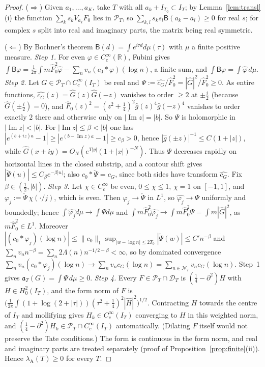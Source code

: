 \documentclass[11pt]{amsart}
\theoremstyle{definition}
\theoremstyle{remark}
\newcommand{\R}{\mathbb R}
\newcommand{\Iml}{\operatorname{Im}}
\newcommand{\PT}{\mathcal P_T}
\newcommand{\IT}{I_T}
\newcommand{\lamA}{\lambda_{\mathrm A}(T)}
\newcommand{\Fh}{\widehat F}
\newcommand{\NT}{\mathcal N_T}
\begin{document}
\begin{proof}
($\Rightarrow$) Given $a_1,\dots,a_K$, take $T$ with all $a_k+I_{T_0}\subset\IT$; by Lemma~\ref{lem:transl}(i) the function
$\sum_ks_kV_{a_k}F_0$ lies in $\PT$, so $\sum_{k,l}s_ks_l\mathsf B(a_k-a_l)\ge0$ for real $s$; for complex $s$ split into real and imaginary
parts, the matrix being real symmetric.

($\Leftarrow$) By Bochner's theorem $\mathsf B(d)=\int e^{i\tau d}d\mu(\tau)$ with $\mu$ a finite positive measure.
\emph{Step 1.} For even $\varphi\in C_c^\infty(\R)$, Fubini gives
$\int\mathsf B\varphi=\frac1{2\pi}\int m\Fh_0^2\widehat\varphi-\sum_nv_n(c_0*\varphi)(\log n)$, a finite sum, and $\int\mathsf B\varphi=\int\widehat\varphi\,d\mu$.
\emph{Step 2.} Let $G\in\PT\cap C_c^\infty(\IT)$ be real and $\Psi:=\widehat{c_G}/\Fh_0^2=|\widehat G|^2/\Fh_0^2\ge0$. As entire functions,
$\widehat{c_G}(z)=\widehat G(z)\widehat G(-z)$ vanishes to order $\ge2$ at $\pm\frac i2$ (because $\widehat G(\pm\frac i2)=0$), and
$\Fh_0(z)^2=(z^2+\frac14)^2\widehat g(z)^4\widehat g(-z)^4$ vanishes to order exactly $2$ there and otherwise only on $|\Iml z|=|b|$. So $\Psi$
is holomorphic in $|\Iml z|<|b|$. For $|\Iml z|\le\beta<|b|$ one has $|e^{(b+iz)a}-1|\ge|e^{(b-\Iml z)a}-1|\ge c_\beta>0$, hence
$|\widehat g(\pm z)|^{-1}\le C(1+|z|)$, while $\widehat G(x+iy)=O_N(e^{T|y|}(1+|x|)^{-N})$. Thus $\Psi$ decreases rapidly on horizontal
lines in the closed substrip, and a contour shift gives $|\check\Psi(u)|\le C_\beta e^{-\beta|u|}$; also $c_0*\check\Psi=c_G$, since both
sides have transform $\widehat{c_G}$. Fix $\beta\in(\frac12,|b|)$.
\emph{Step 3.} Let $\chi\in C_c^\infty$ be even, $0\le\chi\le1$, $\chi=1$ on $[-1,1]$, and $\varphi_j:=\check\Psi\,\chi(\cdot/j)$, which is even.
Then $\varphi_j\to\check\Psi$ in $L^1$, so $\widehat{\varphi_j}\to\Psi$ uniformly and boundedly; hence $\int\widehat{\varphi_j}d\mu\to\int\Psi d\mu$
and $\int m\Fh_0^2\widehat{\varphi_j}\to\int m\Fh_0^2\Psi=\int m|\widehat G|^2$, as $m\Fh_0^2\in L^1$. Moreover
$|(c_0*\varphi_j)(\log n)|\le\|c_0\|_1\sup_{|w-\log n|\le2T_0}|\check\Psi(w)|\le C'n^{-\beta}$ and $\sum_nv_nn^{-\beta}=\sum_n2\Lambda(n)n^{-1/2-\beta}<\infty$, so by
dominated convergence $\sum_nv_n(c_0*\varphi_j)(\log n)\to\sum_nv_nc_G(\log n)=\sum_{n\in\NT}v_nc_G(\log n)$. Step~1 gives
$\mathfrak a_T(G)=\int\Psi\,d\mu\ge0$.
\emph{Step 4.} Every $F\in\PT\cap\mathcal D_T$ is $(\frac14-\partial^2)H$ with $H\in H^2_0(\IT)$, and the form norm of $F$ is
$\big(\frac1{2\pi}\int(1+\log(2+|\tau|))(\tau^2+\frac14)^2|\widehat H|^2\big)^{1/2}$. Contracting $H$ towards the centre of $\IT$ and
mollifying gives $H_k\in C_c^\infty(\IT)$ converging to $H$ in this weighted norm, and $(\frac14-\partial^2)H_k\in\PT\cap C_c^\infty(\IT)$
automatically. (Dilating $F$ itself would not preserve the Tate conditions.) The form is continuous in the form norm, and real
and imaginary parts are treated separately (proof of Proposition~\ref{prop:finite}(ii)). Hence $\lamA\ge0$ for every $T$.
\end{proof}
\end{document}
